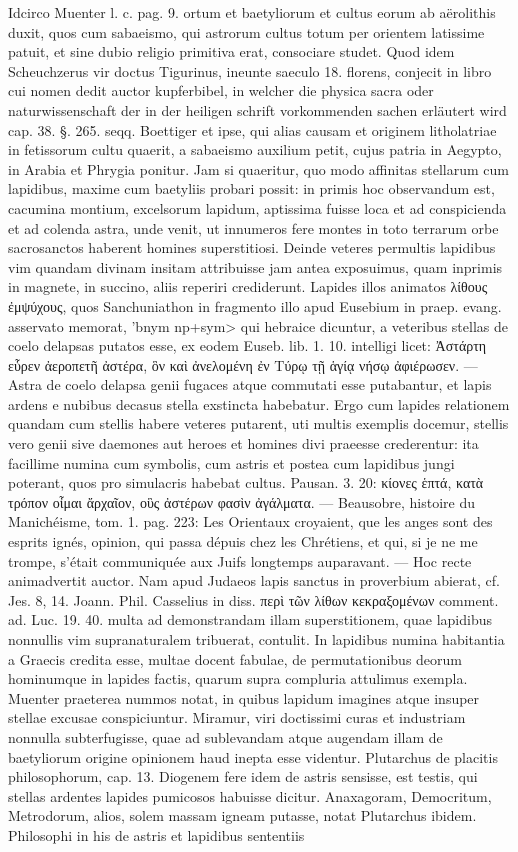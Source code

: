 \documentclass[a4paper, 11pt, oneside, polutonikogreek, german]{article}
\begin{document}
Idcirco Muenter l. c. pag. 9. ortum et baetyliorum et cultus eorum ab aërolithis duxit, quos cum sabaeismo, qui astrorum cultus totum per orientem latissime patuit, et sine dubio religio primitiva erat, consociare studet. Quod idem Scheuchzerus vir doctus Tigurinus, ineunte saeculo 18. florens, conjecit in libro cui nomen dedit auctor kupferbibel, in welcher die physica sacra oder naturwissenschaft der in der heiligen schrift vorkommenden sachen erläutert wird cap. 38. §. 265. seqq. Boettiger et ipse, qui alias causam et originem litholatriae in fetissorum cultu quaerit, a sabaeismo auxilium petit, cujus patria in Aegypto, in Arabia et Phrygia ponitur. Jam si quaeritur, quo modo affinitas stellarum cum lapidibus, maxime cum baetyliis probari possit: in primis hoc observandum est, cacumina montium, excelsorum lapidum, aptissima fuisse loca et ad conspicienda et ad colenda astra, unde venit, ut innumeros fere montes in toto terrarum orbe sacrosanctos haberent homines superstitiosi. Deinde veteres permultis lapidibus vim quandam divinam insitam attribuisse jam antea exposuimus, quam inprimis in magnete, in succino, aliis reperiri crediderunt. Lapides illos animatos λίθους ἐμψύχους, quos Sanchuniathon in fragmento illo apud Eusebium in praep. evang. asservato memorat, \<'bnym np+sym> qui hebraice dicuntur, a veteribus stellas de coelo delapsas putatos esse, ex eodem Euseb. lib. 1. 10. intelligi licet: Ἀστάρτη εὗρεν ἀεροπετῆ ἀστέρα, ὃν καὶ ἀνελομένη ἐν Τύρῳ τῇ ἁγίᾳ νήσῳ ἀφιέρωσεν. --- Astra de coelo delapsa genii fugaces atque commutati esse putabantur, et lapis ardens e nubibus decasus stella exstincta habebatur. Ergo cum lapides relationem quandam cum stellis habere veteres putarent, uti multis exemplis docemur, stellis vero genii sive daemones aut heroes et homines divi praeesse crederentur: ita facillime numina cum symbolis, cum astris et postea cum lapidibus jungi poterant, quos pro simulacris habebat cultus. Pausan. 3. 20: κίονες ἑπτά, κατὰ τρόπον οἶμαι ἄρχαῖον, οὓς ἀστέρων φασὶν ἀγάλματα. --- Beausobre, histoire du Manichéisme, tom. 1. pag. 223: Les Orientaux croyaient, que les anges sont des esprits ignés, opinion, qui passa dépuis chez les Chrétiens, et qui, si je ne me trompe, s'était communiquée aux Juifs longtemps auparavant. --- Hoc recte animadvertit auctor. Nam apud Judaeos lapis sanctus in proverbium abierat, cf. Jes. 8, 14. Joann. Phil. Casselius in diss. περὶ τῶν λίθων κεκραξομένων comment. ad. Luc. 19. 40. multa ad demonstrandam illam superstitionem, quae lapidibus nonnullis vim supranaturalem tribuerat, contulit. In lapidibus numina habitantia a Graecis credita esse, multae docent fabulae, de permutationibus deorum hominumque in lapides factis, quarum supra compluria attulimus exempla. Muenter praeterea nummos notat, in quibus lapidum imagines atque insuper stellae excusae conspiciuntur. Miramur, viri doctissimi curas et industriam nonnulla subterfugisse, quae ad sublevandam atque augendam illam de baetyliorum origine opinionem haud inepta esse videntur. Plutarchus de placitis philosophorum, cap. 13. Diogenem fere idem de astris sensisse, est testis, qui stellas ardentes lapides pumicosos habuisse dicitur. Anaxagoram, Democritum, Metrodorum, alios, solem massam igneam putasse, notat Plutarchus ibidem. Philosophi in his de astris et lapidibus sententiis 
\end{document}

